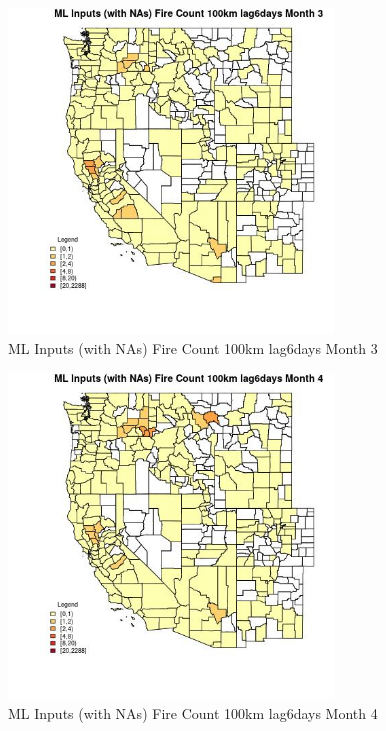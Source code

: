 \begin{figure} 
\centering  
\includegraphics[width=0.77\textwidth]{Code_Outputs/Report_ML_input_PM25_Step4_part_e_de_duplicated_aves_compiled_2019-05-20wNAs_CountyFire_Count_100km_lag6daysmedianMonth3.jpg} 
\caption{\label{fig:Report_ML_input_PM25_Step4_part_e_de_duplicated_aves_compiled_2019-05-20wNAsCountyFire_Count_100km_lag6daysmedianMonth3}ML Inputs (with NAs) Fire Count 100km lag6days Month 3} 
\end{figure} 
 

\begin{figure} 
\centering  
\includegraphics[width=0.77\textwidth]{Code_Outputs/Report_ML_input_PM25_Step4_part_e_de_duplicated_aves_compiled_2019-05-20wNAs_CountyFire_Count_100km_lag6daysmedianMonth4.jpg} 
\caption{\label{fig:Report_ML_input_PM25_Step4_part_e_de_duplicated_aves_compiled_2019-05-20wNAsCountyFire_Count_100km_lag6daysmedianMonth4}ML Inputs (with NAs) Fire Count 100km lag6days Month 4} 
\end{figure} 
 

